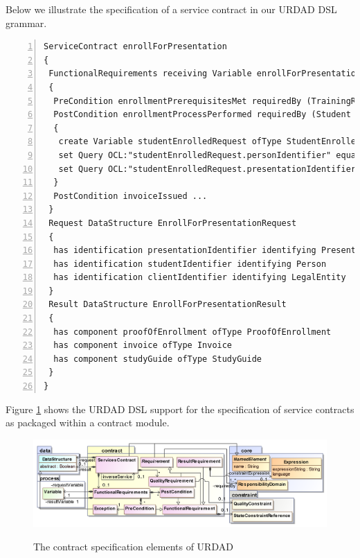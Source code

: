 Below we illustrate the specification of a service contract in our URDAD DSL grammar.
\lstset{language=urdad,caption=Specifying a service contract in the textual URDAD DSL syntax.,label=contractTextSyntax}
\begin{lstlisting}[numbers=left,escapechar=|]
ServiceContract enrollForPresentation
{
 FunctionalRequirements receiving Variable enrollForPresentationRequest ofType EnrollForPresentationRequest
 {
  PreCondition enrollmentPrerequisitesMet requiredBy (TrainingRegulator Student) raises EnrollmentPrerequisitesNotSatisfiedException checks constraint enrollmentPrerequisitesForPresentationMet with ValueOf enrollForPresentationRequest
  PostCondition enrollmentProcessPerformed requiredBy (Student Client TrainingRegulator) ensures constraint studentEnrolledForPresentation          with ValueOf studentEnrolledRequest constructedUsing doSequential
  {
   create Variable studentEnrolledRequest ofType StudentEnrolledRequest
   set Query OCL:"studentEnrolledRequest.personIdentifier" equalTo Query OCL:"enrollForPresentationRequest.personIdentifier"                            
   set Query OCL:"studentEnrolledRequest.presentationIdentifier" equalTo Query OCL:"enrollForPresentationRequest.presentationIdentifier"                            
  }  
  PostCondition invoiceIssued ...
 }            
 Request DataStructure EnrollForPresentationRequest 
 {
  has identification presentationIdentifier identifying Presentation
  has identification studentIdentifier identifying Person
  has identification clientIdentifier identifying LegalEntity         
 }
 Result DataStructure EnrollForPresentationResult 
 {
  has component proofOfEnrollment ofType ProofOfEnrollment
  has component invoice ofType Invoice
  has component studyGuide ofType StudyGuide
 }
}
\end{lstlisting}


Figure \ref{fig:contractModule} shows the URDAD DSL support for the specification of service contracts as packaged within a contract module.

\begin{figure}[thbp]
  \centering
  \includegraphics[width=\pagewidth]{contract}\\   
  \caption{The contract specification elements of URDAD}
  \label{fig:contractModule}
\end{figure}


